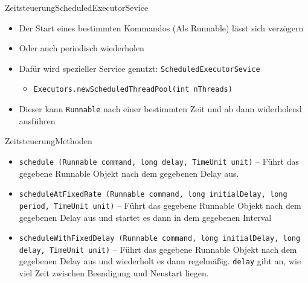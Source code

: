 \begin{frame}{Zeitsteuerung}{ScheduledExecutorSevice}
    \begin{itemize}
        \item Der Start eines bestimmten Kommandos (Als Runnable) lässt sich verzögern
        \item Oder auch periodisch wiederholen
        \item Dafür wird spezieller Service genutzt: \texttt{ScheduledExecutorSevice}
        \begin{itemize}
            \item \texttt{Executors.newScheduledThreadPool(int nThreads)}
        \end{itemize}
        \item Dieser kann \texttt{Runnable} nach einer bestimmten Zeit und ab dann widerholend ausführen
    \end{itemize}
\end{frame}

\begin{frame}{Zeitsteuerung}{Methoden}
    \begin{itemize}
        \item \texttt{schedule (Runnable command, long delay, TimeUnit unit)} -- Führt das gegebene Runnable Objekt nach dem gegebenen Delay aus.
        \item \texttt{scheduleAtFixedRate (Runnable command, long initialDelay, long period, TimeUnit unit)} -- Führt das gegebene Runnable Objekt nach dem gegebenen Delay aus und startet es dann in dem gegebenen Interval
        \item \texttt{scheduleWithFixedDelay (Runnable command, long initialDelay, long delay, TimeUnit unit)} -- Führt das gegebene Runnable Objekt nach dem gegebenen Delay aus und wiederholt es dann regelmäßig. \texttt{delay} gibt an, wie viel Zeit zwischen Beendigung und Neustart liegen.
    \end{itemize}
\end{frame}